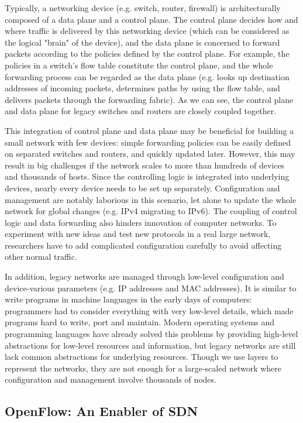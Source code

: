 \documentclass[english]{tktltiki}
\begin{document}
Typically, a networking device (e.g. switch, router, firewall) is architecturally composed of a data plane and a control plane. The control plane decides how and where traffic is delivered by this networking device (which can be considered as the logical "brain" of the device), and the data plane is concerned to forward packets according to the policies defined by the control plane. For example, the policies in a switch's flow table constitute the control plane, and the whole forwarding process can be regarded as the data plane (e.g. looks up destination addresses of incoming packets, determines paths by using the flow table, and delivers packets through the forwarding fabric). As we can see, the control plane and data plane for legacy switches and routers are closely coupled together. 

This integration of control plane and data plane may be beneficial for building a small network with few devices: simple forwarding policies can be easily defined on separated switches and routers, and quickly updated later. However, this may result in big challenges if the network scales to more than hundreds of devices and thousands of hosts. Since the controlling logic is integrated into underlying devices, nearly every device needs to be set up separately. Configuration and management are notably laborious in this scenario, let alone to update the whole network for global changes (e.g. IPv4 migrating to IPv6). The coupling of control logic and data forwarding also hinders innovation of computer networks. To experiment with new ideas and test new protocols in a real large network, researchers have to add complicated configuration carefully to avoid affecting other normal traffic.

In addition, legacy networks are managed through low-level configuration and device-various parameters (e.g. IP addresses and MAC addresses). It is similar to write programs in machine languages in the early days of computers: programmers had to consider everything with very low-level details, which made programs hard to write, port and maintain. Modern operating systems and programming languages have already solved this problems by providing high-level abstractions for low-level resources and information, but legacy networks are still lack common abstractions for underlying resources. Though we use layers to represent the networks, they are not enough for a large-scaled network where configuration and management involve thousands of nodes.

\subsection{OpenFlow: An Enabler of SDN}
\end{document}

